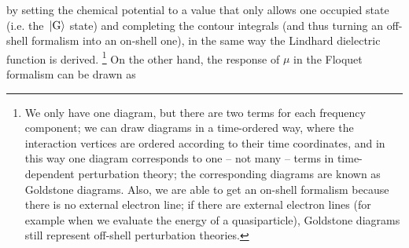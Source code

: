 \documentclass[hyperref, a4paper]{article}
\begin{document}
by setting the chemical potential to a value that only allows one occupied state 
(i.e. the $\ket*{\text{G}}$ state) and 
completing the contour integrals (and thus turning an off-shell formalism into an on-shell one), 
in the same way the Lindhard dielectric function is derived.%
\footnote{
    We only have one diagram, but there are two terms for each frequency component; 
    we can draw diagrams in a time-ordered way, 
    where the interaction vertices are ordered according to their time coordinates,
    and in this way one diagram corresponds to one -- not many -- 
    terms in time-dependent perturbation theory; 
    the corresponding diagrams are known as Goldstone diagrams.
    Also, we are able to get an on-shell formalism 
    because there is no external electron line; 
    if there are external electron lines
    (for example when we evaluate the energy of a quasiparticle), 
    Goldstone diagrams still represent off-shell perturbation theories.
}
On the other hand, the response of $\mu$ in the Floquet formalism can be drawn as 
\end{document}
